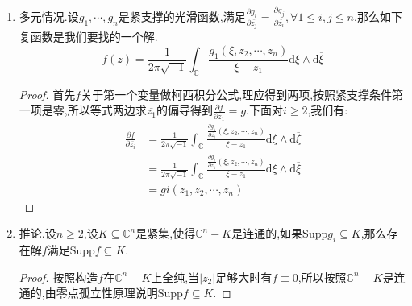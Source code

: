 \begin{enumerate}
\begin{proof}
		最后$g_1$在$\partial\Delta$上取零,于是按照柯西积分公式得到$\frac{\partial}{\partial\overline{z}}f(z)=\frac{\partial}{\partial\overline{z}}f_1(z)=g_1(z)=g(z)$.
	\end{proof}
	\item 多元情况.设$g_1,\cdots,g_n$是紧支撑的光滑函数,满足$\frac{\partial g_i}{\partial\overline{z_j}}=\frac{\partial g_j}{\partial\overline{z_i}},\forall 1\le i,j\le n$.那么如下复函数是我们要找的一个解.
	$$f(z)=\frac{1}{2\pi\sqrt{-1}}\int_{\mathbb{C}}\frac{g_1(\xi,z_2,\cdots,z_n)}{\xi-z_1}\mathrm{d}\xi\wedge\mathrm{d}\overline{\xi}$$
	\begin{proof}
		
		首先$f$关于第一个变量做柯西积分公式,理应得到两项,按照紧支撑条件第一项是零,所以等式两边求$\overline{z_1}$的偏导得到$\frac{\partial f}{\partial\overline{z_1}}=g$.下面对$i\ge2$,我们有:
		\begin{align*}
			\frac{\partial f}{\partial\overline{z_i}}&=\frac{1}{2\pi\sqrt{-1}}\int_{\mathbb{C}}\frac{\frac{\partial g_1}{\partial\overline{z_i}}(\xi,z_2,\cdots,z_n)}{\xi-z_1}\mathrm{d}\xi\wedge\mathrm{d}\overline{\xi}\\&=\frac{1}{2\pi\sqrt{-1}}\int_{\mathbb{C}}\frac{\frac{\partial g_i}{\partial\overline{z_1}}(\xi,z_2,\cdots,z_n)}{\xi-z_1}\mathrm{d}\xi\wedge\mathrm{d}\overline{\xi}\\&=gi(z_1,z_2,\cdots,z_n)
		\end{align*}
	\end{proof}
	\item 推论.设$n\ge2$,设$K\subseteq\mathbb{C}^n$是紧集,使得$\mathbb{C}^n-K$是连通的,如果$\mathrm{Supp}g_i\subseteq K$,那么存在解$f$满足$\mathrm{Supp}f\subseteq K$.
	\begin{proof}
		
		按照构造$f$在$\mathbb{C}^n-K$上全纯,当$|z_2|$足够大时有$f\equiv0$,所以按照$\mathbb{C}^n-K$是连通的,由零点孤立性原理说明$\mathrm{Supp}f\subseteq K$.
	\end{proof}
\end{enumerate}


